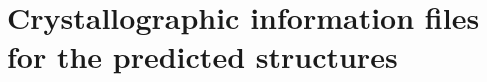 \documentclass[a4paperm]{article}
\begin{document}



\section*{Crystallographic information files for the predicted structures}

\end{document}
